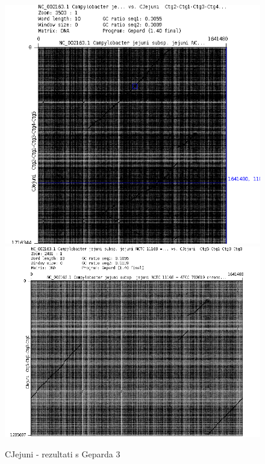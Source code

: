 \begin{figure}[H]
    \centering
    \includegraphics[scale=0.7]{img/Grah2.png}
    \includegraphics[scale=0.5]{img/Grah3.png}
    \caption{CJejuni - rezultati s Geparda 3}
    \label{fig:cjejuni3}
\end{figure}

